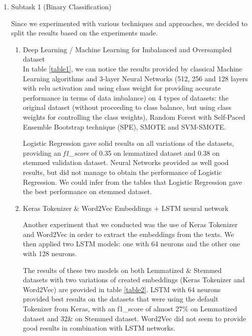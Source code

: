 \documentclass[11pt]{article}
\begin{document}
\begin{enumerate}

	\item Subtask 1 (Binary Classification)

	      Since we experimented with various techniques and approaches, we decided to split the results based on the experiments made.

	      \begin{enumerate}
		      \item Deep Learning / Machine Learning for Imbalanced and Oversampled dataset
		            \\
		            In table \ref{table1}, we can notice the results provided
		            by classical Machine Learning algorithms and 3-layer Neural
		            Networks (512, 256 and 128 layers with relu activation and
		            using class weight for providing accurate performance in
		            terms of data imbalance) on 4 types of datasets: the
		            original dataset (without proceeding to class balance, but
		            using class weights for controlling the class weights),
		            Random Forest with Self-Paced Ensemble Bootstrap technique
		            (SPE), SMOTE and SVM-SMOTE.

		            Logistic Regression gave solid results on all variations of
		            the datasets, providing an \textit{f1\_score} of 0.35 on
		            lemmatized dataset and 0.38 on stemmed validation dataset.
		            Neural Networks provided as well good results, but did not
		            manage to obtain the performance of Logistic Regression. We
		            could infer from the tables that Logistic Regression gave
		            the best performance on stemmed dataset.





		      \item Keras Tokenizer \& Word2Vec Embeddings + LSTM
		            neural network

		            Another experiment that we conducted was the use of Keras
		            Tokenizer and Word2Vec in order to extract the embeddings
		            from the texts. We then applied two LSTM models: one with
		            64 neurons and the other one with 128 neurons.

		            The results of these two models on both Lemmatized \&
		            Stemmed datasets with two variations of created embeddings
		            (Keras Tokenizer and Word2Vec) are provided in table
		            \ref{table2}. LSTM with 64 neurons provided best results on
		            the datasets that were using the default Tokenizer from
		            Keras, with an f1\_score of almost 27\% on Lemmatized
		            dataset and 32\& on Stemmed dataset. Word2Vec did not seem
		            to provide good results in combination with LSTM networks.




\end{enumerate}
\end{enumerate}
\end{document}
